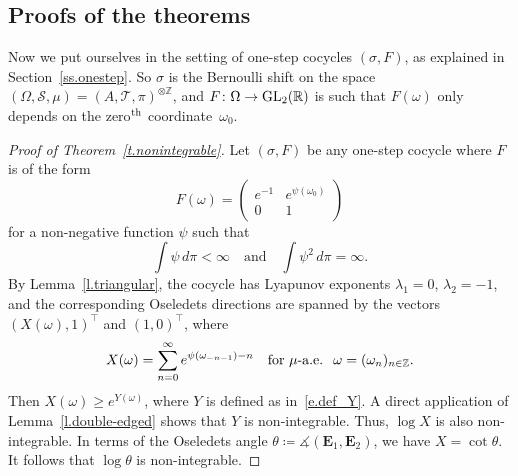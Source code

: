 \documentclass[AHL,Unicode,longabstracts,published]{cedram}
\newcommand{\Z}{\mathbb{Z}}
\newcommand{\R}{\mathbb{R}}
\newcommand{\E}{\mathbf{E}}
\newcommand{\clS}{\mathcal{S}}
\newcommand{\clT}{\mathcal{T}}
\DeclareMathOperator{\GL}{GL}
\renewcommand{\angle}{\measuredangle}
\renewcommand*{\to}{\mathchoice{\longrightarrow}{\rightarrow}{\rightarrow}{\rightarrow}}
\DeclareMathOperator{\GL}{GL}
\newcommand{\R}{\mathbb{R}}
\begin{document}
\subsection{Proofs of the theorems} \label{ss.iid_proofs}

Now we put ourselves in the setting of one-step cocycles $(\sigma,F)$, as explained in Section~\ref{ss.onestep}. So $\sigma$ is the Bernoulli shift on the space $(\Omega,\clS,\mu) = (A,\clT,\pi)^{\otimes \Z}$, and $F \colon \Omega \to \GL_2(\R)$ is such that $F(\omega)$ only depends on the zero$^{\rm th}$ coordinate~$\omega_0$.

\begin{proof}[Proof of Theorem~\ref{t.nonintegrable}]
Let $(\sigma,F)$ be any one-step cocycle where $F$ is of the form
\begin{equation}
F(\omega) =
\begin{pmatrix}
e^{-1} & e^{\psi(\omega_0)}\\
0 & 1
\end{pmatrix}
\end{equation}
for a non-negative function $\psi$ such that
\begin{equation}
\int \psi \, d\pi < \infty \quad \text{and} \quad
\int \psi^2 \, d\pi = \infty.
\end{equation}
By Lemma~\ref{l.triangular}, the cocycle has Lyapunov exponents $\lambda_1 = 0$, $\lambda_2 = -1$, and the corresponding Oseledets directions are spanned by the vectors $(X(\omega),1)^\top$ and $(1,0)^\top$, where
\begin{equation}
X(\omega) = \sum_{n=0}^\infty e^{\psi(\omega_{-n-1}) - n} \quad \text{for $\mu$-a.e.\; }\omega = (\omega_n)_{n \in \Z}.
\end{equation}
Then $X(\omega) \ge e^{Y(\omega)}$, where $Y$ is defined as in~\eqref{e.def_Y}. A direct application of Lemma~\ref{l.double-edged} shows that $Y$ is non-integrable. Thus, $\log X$ is also non-integrable. In terms of the Oseledets angle $\theta \coloneqq \angle(\E_1, \E_2)$, we have $X = \cot \theta$. It follows that $\log \theta$ is non-integrable.
\end{proof}
\end{document}
